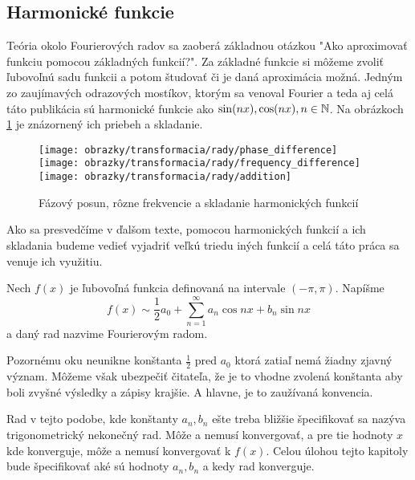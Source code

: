 \subsection{Harmonické funkcie}

Teória okolo Fourierových radov sa zaoberá základnou otázkou "Ako
aproximovať funkciu pomocou základných funkcií?".
Za základné funkcie si môžeme zvoliť ľubovoľnú sadu funkcii a potom
študovať či je daná aproximácia možná. Jedným zo zaujímavých
odrazových mostíkov, ktorým sa venoval Fourier a teda aj celá táto
publikácia sú harmonické funkcie ako $\sin(n x), \cos(nx), n \in \mathbb{N}$.
Na obrázkoch \ref{fig:harmonic_illustration} je znázornený ich priebeh a skladanie.

\begin{figure}[htp]
    \centering
    \texttt{[image: obrazky/transformacia/rady/phase\_difference]}
    \texttt{[image: obrazky/transformacia/rady/frequency\_difference]}
    \texttt{[image: obrazky/transformacia/rady/addition]}
    \caption{Fázový posun, rôzne frekvencie a skladanie harmonických
    funkcií}\label{fig:harmonic_illustration}
\end{figure}

Ako sa presvedčíme v ďalšom texte, pomocou harmonických funkcií a ich
skladania budeme vedieť vyjadriť veľkú triedu iných funkcií a celá
táto práca sa venuje ich využitiu.

\begin{definicia} Nech $f(x)$ je ľubovoľná funkcia definovaná na
intervale $(-\pi,\pi)$. Napíšme
    \begin{equation}
        f(x) \sim \frac{1}{2} a_0 + \sum_{n=1}^{\infty} a_n
        \cos n x + b_n \sin n x
    \label{eq:trig_series}
    \end{equation}
a daný rad nazvime Fourierovým radom.
    \label{def:fourier_series}
\end{definicia}

\begin{poznamka}
    Pozornému oku neunikne konštanta $\frac{1}{2}$ pred $a_0$ ktorá
    zatiaľ nemá žiadny zjavný význam. Môžeme však ubezpečiť čitateľa,
    že je to vhodne zvolená konštanta aby boli zvyšné výsledky a
    zápisy krajšie. A hlavne, je to zaužívaná konvencia.
\end{poznamka}

Rad v tejto podobe, kde konštanty $a_n, b_n$ ešte treba bližšie
špecifikovať sa nazýva trigonometrický nekonečný rad. Môže a nemusí
konvergovať, a pre tie hodnoty $x$ kde konverguje, môže a nemusí
konvergovať k $f(x)$. Celou úlohou tejto kapitoly bude špecifikovať
aké sú hodnoty $a_n, b_n$ a kedy rad konverguje.


